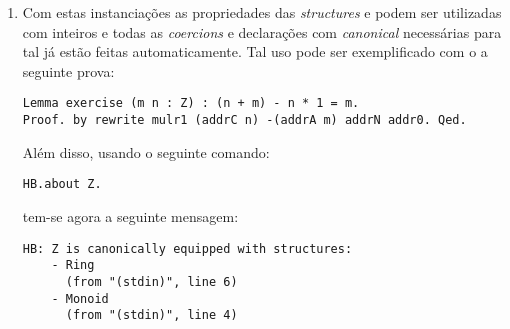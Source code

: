 {{\begin{enumerate}
\begin{lstlisting}[language=coq, frame=single, tabsize=1]
HB.instance Definition Z_Ring_axioms : Ring_of_Monoid Z :=
  Ring_of_Monoid.Build Z 1%Z Z.opp Z.mul
    Z.add_opp_diag_l Z.add_opp_diag_r Z.mul_assoc Z.mul_1_l Z.mul_1_r
    Z.mul_add_distr_r Z.mul_add_distr_l.
            \end{lstlisting}

        Note que na última instanciação não é necessário passar como argumento do construtor os argumentos para formação de um monoide. Isto ocorre pois estes construtores, conforme \cite{cohen:hal-02478907}, não são simplesmente construtores como os de \textit{records}, e o addon  infere estes argumentos automaticamente verificando a existência da instância declarada anteriormente com .

        \item Com estas instanciações as propriedades das \textit{structures}  e  podem ser utilizadas com inteiros e todas as \textit{coercions} e declarações com \textit{canonical} necessárias para tal já estão feitas automaticamente. Tal uso pode ser exemplificado com o a seguinte prova:
            \begin{lstlisting}[language=coq, frame=single, tabsize=1]
Lemma exercise (m n : Z) : (n + m) - n * 1 = m.
Proof. by rewrite mulr1 (addrC n) -(addrA m) addrN addr0. Qed.
            \end{lstlisting}

        Além disso, usando o seguinte comando:
            \begin{lstlisting}[language=coq, frame=single, tabsize=1]
HB.about Z.
            \end{lstlisting}

        tem-se agora a seguinte mensagem:
            \begin{lstlisting}[language=coq-error, frame=single, tabsize=1]
HB: Z is canonically equipped with structures:
    - Ring
      (from "(stdin)", line 6)
    - Monoid
      (from "(stdin)", line 4)
            \end{lstlisting}


\end{enumerate}}}
